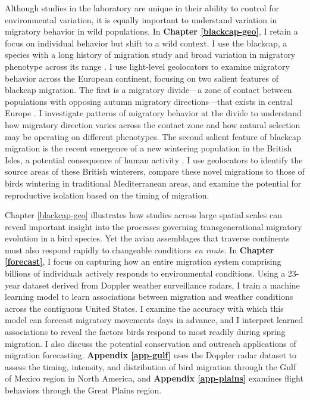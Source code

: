 \documentclass[a4paper, nobind]{templates/ociamthesis}
\begin{document}
Although studies in the laboratory are unique in their ability to control for environmental variation, it is equally important to understand variation in migratory behavior in wild populations. In \textbf{Chapter \ref{blackcap-geo}}, I retain a focus on individual behavior but shift to a wild context. I use the blackcap, a species with a long history of migration study and broad variation in migratory phenotype across its range \autocite{crampSylviaAtricapillaBlackcap1992}. I use light-level geolocators to examine migratory behavior across the European continent, focusing on two salient features of blackcap migration. The first is a migratory divide---a zone of contact between populations with opposing autumn migratory directions---that exists in central Europe \autocite{helbigInheritanceMigratoryDirection1991,helbigSESWmigratingBlackcap1991,helbigPopulationDifferentiationMigratory1992}. I investigate patterns of migratory behavior at the divide to understand how migratory direction varies across the contact zone and how natural selection may be operating on different phenotypes. The second salient feature of blackcap migration is the recent emergence of a new wintering population in the British Isles, a potential consequence of human activity \autocite{leachWinteringBlackcapsBritain1981,bertholdMigratoryBehaviourPopulation1988,bertholdRapidMicroevolutionMigratory1992,bearhopAssortativeMatingMechanism2005}. I use geolocators to identify the source areas of these British winterers, compare these novel migrations to those of birds wintering in traditional Mediterranean areas, and examine the potential for reproductive isolation based on the timing of migration.

Chapter \ref{blackcap-geo} illustrates how studies across large spatial scales can reveal important insight into the processes governing transgenerational migratory evolution in a bird species. Yet the avian assemblages that traverse continents must also respond rapidly to changeable conditions \emph{en route}. In \textbf{Chapter \ref{forecast}}, I focus on capturing how an entire migration system comprising billions of individuals actively responds to environmental conditions. Using a 23-year dataset derived from Doppler weather surveillance radars, I train a machine learning model to learn associations between migration and weather conditions across the contiguous United States. I examine the accuracy with which this model can forecast migratory movements days in advance, and I interpret learned associations to reveal the factors birds respond to most readily during spring migration. I also discuss the potential conservation and outreach applications of migration forecasting. \textbf{Appendix \ref{app-gulf}} uses the Doppler radar dataset to assess the timing, intensity, and distribution of bird migration through the Gulf of Mexico region in North America, and \textbf{Appendix \ref{app-plains}} examines flight behaviors through the Great Plains region.
\end{document}
